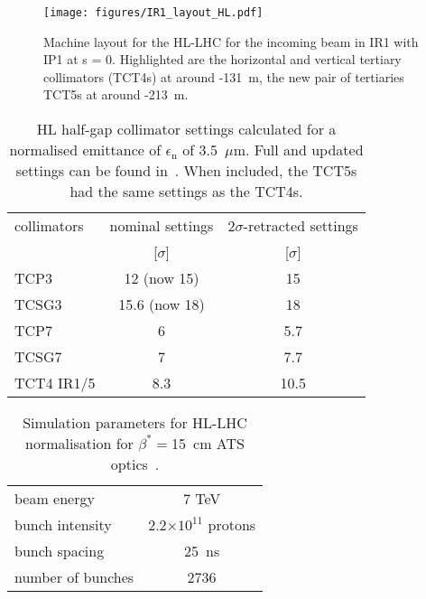 \begin{figure}%
\begin{center}
\texttt{[image: figures/IR1\_layout\_HL.pdf]}
\end{center}
\vspace{-0.6cm}
 \caption{Machine layout for the HL-LHC for the incoming beam in IR1 with IP1 at s = 0. Highlighted are the horizontal and vertical tertiary collimators (TCT4s) at around -131~m, the new pair of tertiaries TCT5s at around -213~m.
  \label{hllhc_layout}}
\end{figure}


 \begin{table}%
   \centering
   \caption{HL half-gap collimator settings calculated for a normalised emittance of $\epsilon_{\mathrm{n}}$ of 3.5~$\mu$m. Full and updated settings can be found in~\cite{collSettRef}. When included, the TCT5s had the same settings as the TCT4s.}

   \begin{tabular}{l|c|c}
       \hline
       collimators &        nominal settings & $2\sigma$-retracted settings\\
                   &         [$\sigma$] &  [$\sigma$]\\
       \hline
       TCP3 & 12 (now 15) & 15 \\
       TCSG3 & 15.6 (now 18)& 18 \\
       TCP7 & 6 & 5.7 \\
       TCSG7 & 7 & 7.7 \\
       TCT4 IR1/5 & 8.3 & 10.5 \\
       \hline
   \end{tabular}
   \label{HLcollSettings}
\end{table}

\begin{table}%
   \centering
   \caption{Simulation parameters for HL-LHC normalisation for $\beta^* =$15~cm ATS optics~\cite{ATSref}.}
   \begin{tabular}{l|c}
       \hline
       beam energy & 7 TeV \\
       bunch intensity & 2.2$\times 10^{11}$ protons\\
       bunch spacing & 25~ns \\
       number of bunches & 2736 \\
       \hline
   \end{tabular}
   \label{hlscenario}
\end{table}
